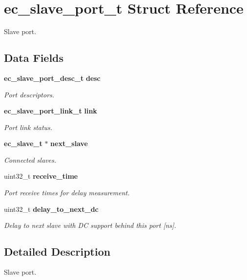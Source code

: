 \section{ec\-\_\-slave\-\_\-port\-\_\-t \-Struct \-Reference}
\label{structec__slave__port__t}


\-Slave port.  


\subsection*{\-Data \-Fields}
\begin{DoxyCompactItemize}
\item 
{\bf ec\-\_\-slave\-\_\-port\-\_\-desc\-\_\-t} {\bf desc}
\begin{DoxyCompactList}\small\item\em \-Port descriptors. \end{DoxyCompactList}\item 
{\bf ec\-\_\-slave\-\_\-port\-\_\-link\-\_\-t} {\bf link}
\begin{DoxyCompactList}\small\item\em \-Port link status. \end{DoxyCompactList}\item 
{\bf ec\-\_\-slave\-\_\-t} $\ast$ {\bf next\-\_\-slave}
\begin{DoxyCompactList}\small\item\em \-Connected slaves. \end{DoxyCompactList}\item 
uint32\-\_\-t {\bf receive\-\_\-time}
\begin{DoxyCompactList}\small\item\em \-Port receive times for delay measurement. \end{DoxyCompactList}\item 
uint32\-\_\-t {\bf delay\-\_\-to\-\_\-next\-\_\-dc}
\begin{DoxyCompactList}\small\item\em \-Delay to next slave with \-D\-C support behind this port [ns]. \end{DoxyCompactList}\end{DoxyCompactItemize}


\subsection{\-Detailed \-Description}
\-Slave port. 

